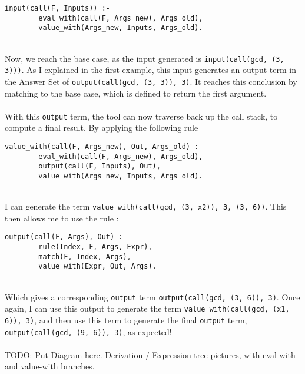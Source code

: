 \begin{lstlisting}
input(call(F, Inputs)) :- 
		eval_with(call(F, Args_new), Args_old), 
		value_with(Args_new, Inputs, Args_old).
\end{lstlisting}
\mbox{} \\
Now, we reach the base case, as the input generated is \lstinline{input(call(gcd, (3, 3)))}. As I explained in the first example, this input generates an output term in the Answer Set of \lstinline{output(call(gcd, (3, 3)), 3)}. It reaches this conclusion by matching to the base case, which is defined to return the first argument. \\ \\
With this \lstinline{output} term, the tool can now traverse back up the call stack, to compute a final result. By applying the following rule \\ %

\begin{lstlisting}
value_with(call(F, Args_new), Out, Args_old) :- 
		eval_with(call(F, Args_new), Args_old), 
		output(call(F, Inputs), Out), 
		value_with(Args_new, Inputs, Args_old).
\end{lstlisting}
\mbox{} \\
I can generate the term \lstinline{value_with(call(gcd, (3, x2)), 3, (3, 6))}. This then allows me to use the rule : \\%


\begin{lstlisting}
output(call(F, Args), Out) :- 
		rule(Index, F, Args, Expr), 
		match(F, Index, Args),
		value_with(Expr, Out, Args).
\end{lstlisting}
\mbox{} \\
Which gives a corresponding \lstinline{output} term \lstinline{output(call(gcd, (3, 6)), 3)}. Once again, I can use this output to generate the term \lstinline{value_with(call(gcd, (x1, 6)), 3)}, and then use this term to generate the final \lstinline{output} term, \lstinline{output(call(gcd, (9, 6)), 3)}, as expected! \\ \\%
TODO: Put Diagram here. Derivation / Expression tree pictures, with eval-with and value-with branches.

\pagebreak
%
%